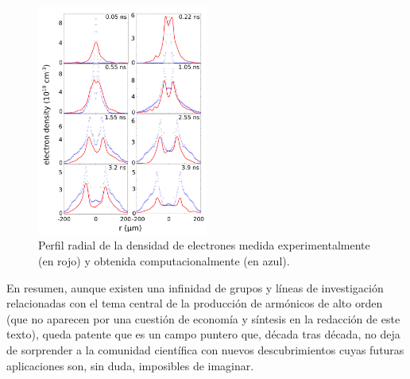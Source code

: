 \begin{figure}[htbp]
  \centering
  \includegraphics[width=0.5\textwidth]{Figuras/ch1_radprofile.png}
  \caption{Perfil radial de la densidad de electrones medida experimentalmente (en rojo) y obtenida computacionalmente (en azul). \autocite{Oliva2018}}
  \label{fig:1.29}
\end{figure}

En resumen, aunque existen una infinidad de grupos y líneas de investigación relacionadas con el tema central de la producción de armónicos de alto orden (que no aparecen por una cuestión de economía y síntesis en la redacción de este texto), queda patente que es un campo puntero que, década tras década, no deja de sorprender a la comunidad científica con nuevos descubrimientos cuyas futuras aplicaciones son, sin duda, imposibles de imaginar.
